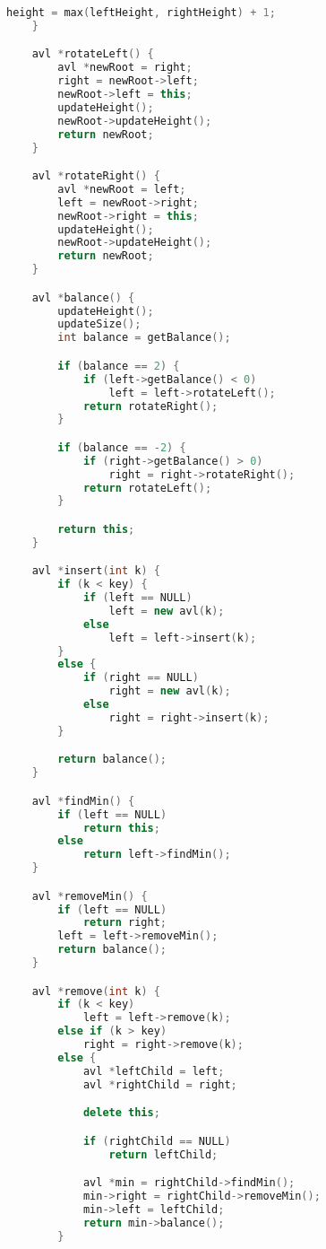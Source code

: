 \documentclass[leter]{amsart}
\begin{document}
\begin{multicols}{2}
\begin{lstlisting}[language=C++]
        height = max(leftHeight, rightHeight) + 1;
    }

    avl *rotateLeft() {
        avl *newRoot = right;
        right = newRoot->left;
        newRoot->left = this;
        updateHeight();
        newRoot->updateHeight();
        return newRoot;
    }

    avl *rotateRight() {
        avl *newRoot = left;
        left = newRoot->right;
        newRoot->right = this;
        updateHeight();
        newRoot->updateHeight();
        return newRoot;
    }

    avl *balance() {
        updateHeight();
        updateSize();
        int balance = getBalance();

        if (balance == 2) {
            if (left->getBalance() < 0)
                left = left->rotateLeft();
            return rotateRight();
        }

        if (balance == -2) {
            if (right->getBalance() > 0)
                right = right->rotateRight();
            return rotateLeft();
        }

        return this;
    }

    avl *insert(int k) {
        if (k < key) {
            if (left == NULL)
                left = new avl(k);
            else
                left = left->insert(k);
        }
        else {
            if (right == NULL)
                right = new avl(k);
            else
                right = right->insert(k);
        }

        return balance();
    }

    avl *findMin() {
        if (left == NULL)
            return this;
        else
            return left->findMin();
    }

    avl *removeMin() {
        if (left == NULL)
            return right;
        left = left->removeMin();
        return balance();
    }

    avl *remove(int k) {
        if (k < key)
            left = left->remove(k);
        else if (k > key)
            right = right->remove(k);
        else {
            avl *leftChild = left;
            avl *rightChild = right;

            delete this;

            if (rightChild == NULL)
                return leftChild;

            avl *min = rightChild->findMin();
            min->right = rightChild->removeMin();
            min->left = leftChild;
            return min->balance();
        }


\end{lstlisting}
\end{multicols}
\end{document}
